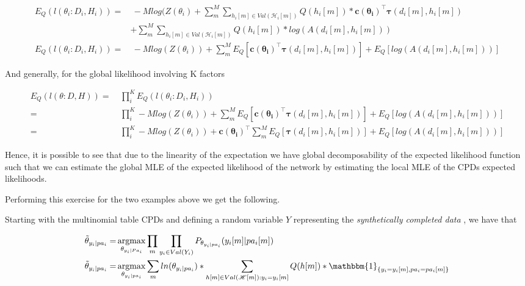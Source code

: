 \documentclass[11pt]{article}
\begin{document}
\begin{article}
\begin{align} \label{eq:complete-exponential-family-likelihood}
E_Q(l(\theta_i :D_i, H_i)) =& \ - Mlog(Z(\theta_i) + \sum_m^M \sum_{h_i[m] \in Val(\mathscr{H}_i[m])} Q(h_i[m]) * \mathbf{c(\theta_i)}^\intercal \mathbf{\tau}(d_i[m], h_i[m])\\
            & + \sum_m^M \sum_{h_i[m] \in Val(\mathscr{H}_i[m])} Q(h_i[m]) * log(A(d_i[m], h_i[m]))  \nonumber \\
E_Q(l(\theta_i :D_i, H_i)) =& \ - Mlog(Z(\theta_i)) + \sum_m^M E_Q[\mathbf{c(\theta_i)}^\intercal \mathbf{\tau}(d_i[m], h_i[m])] + E_Q[log(A(d_i[m], h_i[m]))]
\end{align}

And generally, for the global likelihood involving K factors

\begin{align} \label{eq:global-likelihood}
E_Q(l(\theta :D, H)) =& \ \prod_i^K E_Q(l(\theta_i :D_i, H_i)) \nonumber \\
               =& \ \prod_i^K - Mlog(Z(\theta_i)) + \sum_m^M E_Q[\mathbf{c(\theta_i)}^\intercal \mathbf{\tau}(d_i[m], h_i[m])] + E_Q[log(A(d_i[m], h_i[m]))] \\
               =& \ \prod_i^K - Mlog(Z(\theta_i)) + \mathbf{c(\theta_i)}^\intercal \sum_m^M E_Q[\mathbf{\tau}(d_i[m], h_i[m])] + E_Q[log(A(d_i[m], h_i[m]))] \nonumber  
\end{align}

Hence, it is possible to see that due to the linearity of the
expectation we have global decomposability of the expected
likelihood function such that we can estimate the global MLE of
the expected likelihood of the network by estimating the local MLE
of the CPDs expected likelihoods.

Performing this exercise for the two examples above we get the
following.

Starting with the multinomial table CPDs and defining a random
variable \(Y\) representing the \emph{synthetically completed data} \(<H, D>\),
we have that

\begin{align} \label{eq:solution}
\tilde{\theta}_{y_i | pa_i} =& \operatorname*{argmax}_{\theta_{y_i | Pa_i}}  \prod_m \prod_{y_i \in Val(Y_i)} P_{\theta_{y_i|pa_i}}(y_i[m]|pa_i[m]) \nonumber  \\
\tilde{\theta}_{y_i | pa_i} =& \operatorname*{argmax}_{\theta_{y_i | pa_i}} \sum_m ln(\theta_{y_i | pa_i}) * \sum_{h[m] \in Val(\mathscr{H}[m]) : y_i = y_i[m]} Q(h[m]) * \mathbbm{1}_{\{y_i = y_i[m], pa_i = pa_i[m]\}}
\end{align}


\end{article}
\end{document}

